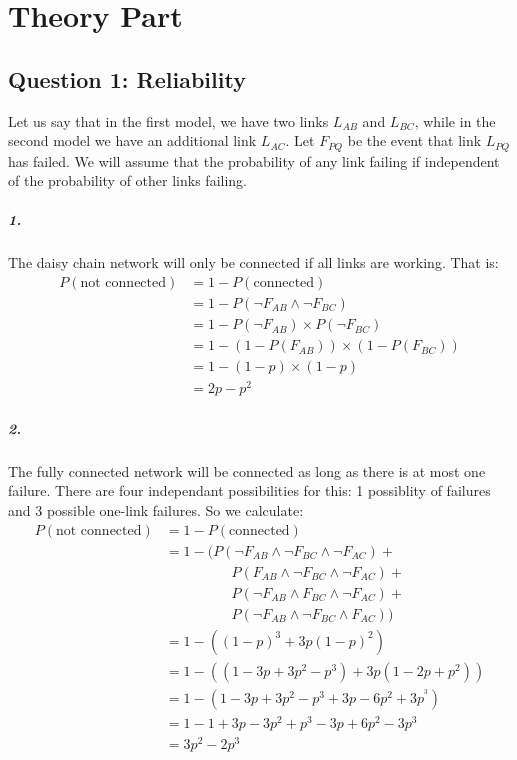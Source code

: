\chapter{Theory Part}

\section{Question 1: Reliability}

Let us say that in the first model, we have two links $L_{AB}$ and
$L_{BC}$, while in the second model we have an additional link
$L_{AC}$. Let $F_{PQ}$ be the event that link $L_{PQ}$ has failed. We
will assume that the probability of any link failing if independent of
the probability of other links failing.

\paragraph{1.} The daisy chain network will only be connected if all
links are working. That is:
\begin{align*}
P(\textrm{not connected})
&= 1 - P(\textrm{connected}) \\
&= 1 - P(\neg F_{AB} \land \neg F_{BC}) \\
&= 1 - P(\neg F_{AB}) \times P(\neg F_{BC}) \\
&= 1 - (1 - P(F_{AB})) \times (1 - P(F_{BC})) \\
&= 1 - (1 - p) \times (1 - p) \\ &
= 2p - p^2
\end{align*}

\paragraph{2.} The fully connected network will be connected as long
as there is at most one failure. There are four independant
possibilities for this: 1 possiblity of failures and 3 possible
one-link failures. So we calculate:
\begin{align*}
P(\textrm{not connected})
&= 1 - P(\textrm{connected}) \\
&= 1 - (P(\neg F_{AB} \land \neg F_{BC} \land \neg F_{AC}) + \\
&\hspace{2cm} P(F_{AB} \land \neg F_{BC} \land \neg F_{AC}) + \\
&\hspace{2cm} P(\neg F_{AB} \land F_{BC} \land \neg F_{AC}) + \\
&\hspace{2cm} P(\neg F_{AB} \land \neg F_{BC} \land F_{AC})) \\
&= 1 - ((1 - p)^3 + 3p(1-p)^2) \\
&= 1 - ((1 - 3p + 3p^2 - p^3) + 3p(1 - 2p + p^2)) \\
&= 1 - (1 - 3p + 3p^2 - p^3 + 3p - 6p^2 + 3p^^3) \\
&= 1 - 1 + 3p - 3p^2 + p^3 - 3p + 6p^2 - 3p^3 \\
&= 3p^2 - 2p^3 \\
\end{align*}

